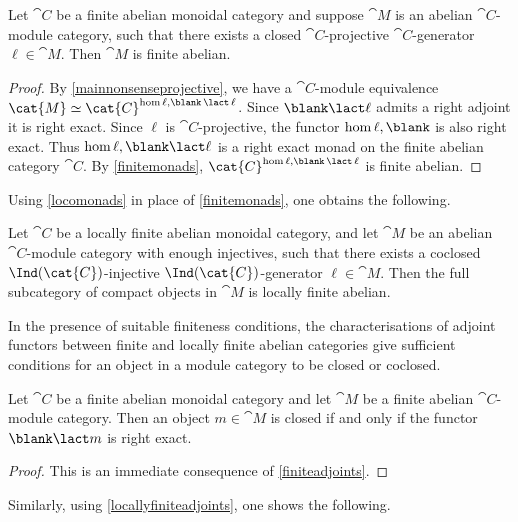 \begin{proposition}
  Let \(\cat{C}\) be a finite abelian monoidal category
  and suppose \(\cat{M}\) is an abelian \(\cat{C}\)\hyp{}module category,
  such that there exists a closed \(\cat{C}\)\hyp{}projective \(\cat{C}\)\hyp{}generator \(\ell \in \cat{M}\).
  Then \(\cat{M}\) is finite abelian.
\end{proposition}
\begin{proof}
  By \cref{mainnonsenseprojective}, we have a \(\cat{C}\)\hyp{}module equivalence \(\cat{M} \simeq \cat{C}^{\hom{\ell,\blank \,\lact\, \ell}}\).
  Since \(\blank \lact \ell\) admits a right adjoint it is right exact.
  Since \(\ell\) is \(\cat{C}\)\hyp{}projective, the functor \(\hom{\ell, \blank}\) is also right exact.
  Thus \(\hom{\ell, \blank \lact \ell}\) is a right exact monad on the finite abelian category \(\cat{C}\).
  By \cref{finitemonads}, \(\cat{C}^{\hom{\ell, \blank \,\lact\, \ell}}\) is finite abelian.
\end{proof}

Using \cref{locomonads} in place of \cref{finitemonads}, one obtains the following.

\begin{proposition}
  Let \(\cat{C}\) be a locally finite abelian monoidal category,
  and let \(\cat{M}\) be an abelian \(\cat{C}\)\hyp{}module category with enough injectives,
  such that there exists a coclosed \(\Ind(\cat{C})\)\hyp{}injective \(\Ind(\cat{C})\)\hyp{}generator \(\ell \in \cat{M}\).
  Then the full subcategory of compact objects in \(\cat{M}\) is locally finite abelian.
\end{proposition}

In the presence of suitable finiteness conditions,
the characterisations of adjoint functors between finite and locally finite abelian categories
give sufficient conditions for an object in a module category to be closed or coclosed.

\begin{proposition}
  Let \(\cat{C}\) be a finite abelian monoidal category and let \(\cat{M}\) be a finite abelian \(\cat{C}\)\hyp{}module category.
  Then an object \(m \in \cat{M}\) is closed if and only if the functor \(\blank \lact m\) is right exact.
\end{proposition}
\begin{proof}
  This is an immediate consequence of \cref{finiteadjoints}.
\end{proof}

Similarly, using \cref{locallyfiniteadjoints}, one shows the following.

